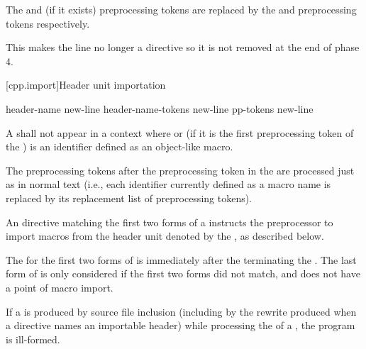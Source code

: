 \pnum
The  and  (if it exists) preprocessing tokens
are replaced by the  and
 preprocessing tokens respectively.
\begin{note}
This makes the line no longer a directive
so it is not removed at the end of phase 4.
\end{note}

[cpp.import]{Header unit importation}
%
%
%

\begin{bnf}
\br
      header-name  \terminal{;} new-line\br
      header-name-tokens  \terminal{;} new-line\br
      pp-tokens \terminal{;} new-line
\end{bnf}

\pnum
A  shall not
appear in a context where 
or (if it is the first preprocessing token of the ) 
is an identifier defined as an object-like macro.

\pnum
The preprocessing tokens after the  preprocessing token
in the  
are processed just as in normal text
(i.e., each identifier currently defined as a macro name
is replaced by its replacement list of preprocessing tokens).
\begin{note}
An  directive
matching the first two forms of a 
instructs the preprocessor to import macros
from the header unit
denoted by the ,
as described below.
\end{note}
%
The  for the
first two forms of  is
immediately after the  terminating
the .
The last form of  is only considered
if the first two forms did not match, and
does not have a point of macro import.

\pnum
If a  is produced by source file inclusion
(including by the rewrite produced
when a  directive names an importable header)
while processing the  of a ,
the program is ill-formed.

